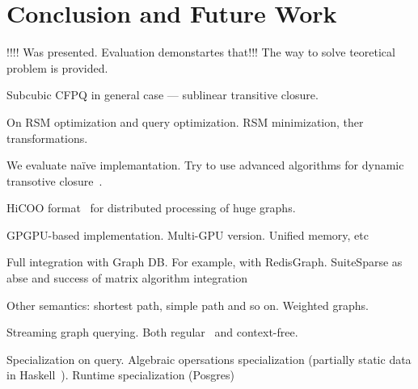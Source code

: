 \section{Conclusion and Future Work}

!!!! Was presented.
Evaluation demonstartes that!!!
The way to solve teoretical problem is provided.

Subcubic CFPQ in general case --- sublinear transitive closure.

On RSM optimization and query optimization. RSM minimization, ther transformations.

We evaluate na{\"i}ve implemantation. Try to use advanced algorithms for dynamic transotive closure~\cite{cs6345}.

HiCOO format~\cite{!!!} for distributed processing of huge graphs.

GPGPU-based implementation. Multi-GPU version. Unified memory, etc~\cite{!!!}

Full integration with Graph DB.
For example, with RedisGraph.
SuiteSparse as abse and success of matrix algorithm integration~\cite{!!!}

Other semantics: shortest path, simple path and so on. 
Weighted graphs.

Streaming graph querying.
Both regular~\cite{Pacaci2020RegularPQ} and context-free.

Specialization on query.
Algebraic opersations specialization (partially static data in Haskell~\cite{!!!}).
Runtime specialization (Posgres)~\cite{!!!}
